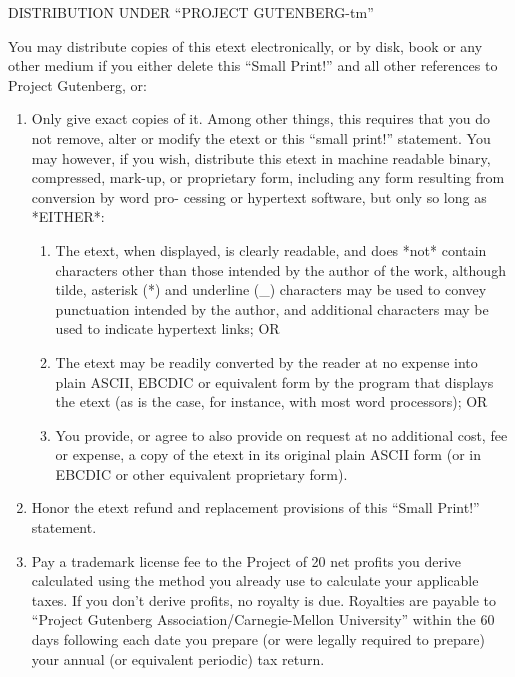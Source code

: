 \documentclass[12pt]{book}
\begin{document}
\begin{center}
DISTRIBUTION UNDER ``PROJECT GUTENBERG-tm''
\end{center}

You may distribute copies of this etext electronically, or by
disk, book or any other medium if you either delete this
``Small Print!'' and all other references to Project Gutenberg,
or:

\begin{enumerate}
\item  Only give exact copies of it.  Among other things, this
     requires that you do not remove, alter or modify the
     etext or this ``small print!'' statement.  You may however,
     if you wish, distribute this etext in machine readable
     binary, compressed, mark-up, or proprietary form,
     including any form resulting from conversion by word pro-
     cessing or hypertext software, but only so long as
     *EITHER*:
\begin{enumerate}
\item     The etext, when displayed, is clearly readable, and
          does *not* contain characters other than those
          intended by the author of the work, although tilde,
          asterisk (*) and underline (\_) characters may
          be used to convey punctuation intended by the
          author, and additional characters may be used to
          indicate hypertext links; OR

\item     The etext may be readily converted by the reader at
          no expense into plain ASCII, EBCDIC or equivalent
          form by the program that displays the etext (as is
          the case, for instance, with most word processors);
          OR

\item     You provide, or agree to also provide on request at
          no additional cost, fee or expense, a copy of the
          etext in its original plain ASCII form (or in EBCDIC
          or other equivalent proprietary form).
\end{enumerate}
\item  Honor the etext refund and replacement provisions of this
    ``Small Print!'' statement.

\item  Pay a trademark license fee to the Project of 20%
     net profits you derive calculated using the method you
     already use to calculate your applicable taxes.  If you
     don't derive profits, no royalty is due.  Royalties are
     payable to ``Project Gutenberg Association/Carnegie-Mellon
     University'' within the 60 days following each
     date you prepare (or were legally required to prepare)
     your annual (or equivalent periodic) tax return.
\end{enumerate}
\end{document}
